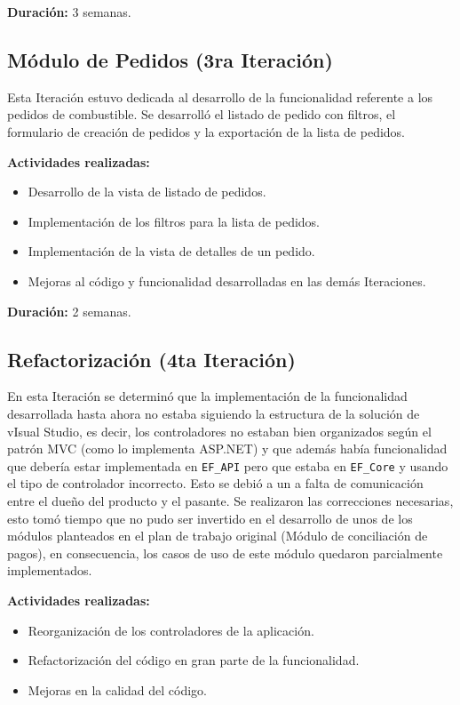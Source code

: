 \textbf{Duración:} 3 semanas.

\subsection{Módulo de Pedidos (3ra Iteración)}
Esta Iteración estuvo dedicada al desarrollo de la funcionalidad referente a los pedidos de combustible. Se desarrolló el listado de pedido con filtros, el formulario de creación de pedidos y la exportación de la lista de pedidos.

\textbf{Actividades realizadas:}
\begin{itemize}
    \item Desarrollo de la vista de listado de pedidos.
    \item Implementación de los filtros para la lista de pedidos.
    \item Implementación de la vista de detalles de un pedido.
    \item Mejoras al código y funcionalidad desarrolladas en las demás Iteraciones.
\end{itemize}

\textbf{Duración:} 2 semanas.

\subsection{Refactorización (4ta Iteración)}
En esta Iteración se determinó que la implementación de la funcionalidad desarrollada hasta ahora no estaba siguiendo la estructura de la solución de vIsual Studio, es decir, los controladores no estaban bien organizados según el patrón MVC (como lo implementa ASP.NET) y que además había funcionalidad que debería estar implementada en \verb|EF_API| pero que estaba en \verb|EF_Core| y usando el tipo de controlador incorrecto. Esto se debió a un a falta de comunicación entre el dueño del producto y el pasante. Se realizaron las correcciones necesarias, esto tomó tiempo que no pudo ser invertido en el desarrollo de unos de los módulos planteados en el plan de trabajo original (Módulo de conciliación de pagos), en consecuencia, los casos de uso de este módulo quedaron parcialmente implementados.

\textbf{Actividades realizadas:}
\begin{itemize}
    \item Reorganización de los controladores de la aplicación.
    \item Refactorización del código en gran parte de la funcionalidad.
    \item Mejoras en la calidad del código.
\end{itemize}

